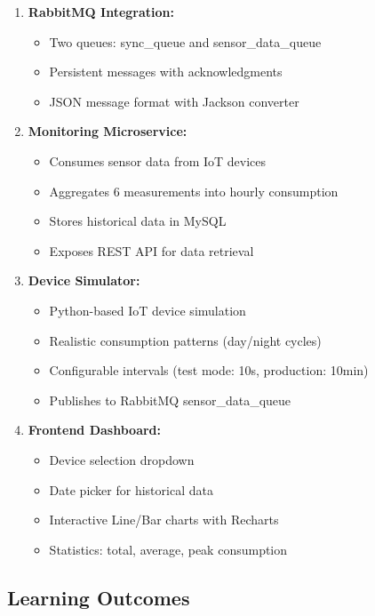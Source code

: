 \documentclass[12pt,a4paper]{article}
\begin{document}
\begin{enumerate}
    \item \textbf{RabbitMQ Integration:}
    \begin{itemize}
        \item Two queues: sync\_queue and sensor\_data\_queue
        \item Persistent messages with acknowledgments
        \item JSON message format with Jackson converter
    \end{itemize}
    
    \item \textbf{Monitoring Microservice:}
    \begin{itemize}
        \item Consumes sensor data from IoT devices
        \item Aggregates 6 measurements into hourly consumption
        \item Stores historical data in MySQL
        \item Exposes REST API for data retrieval
    \end{itemize}
    
    \item \textbf{Device Simulator:}
    \begin{itemize}
        \item Python-based IoT device simulation
        \item Realistic consumption patterns (day/night cycles)
        \item Configurable intervals (test mode: 10s, production: 10min)
        \item Publishes to RabbitMQ sensor\_data\_queue
    \end{itemize}
    
    \item \textbf{Frontend Dashboard:}
    \begin{itemize}
        \item Device selection dropdown
        \item Date picker for historical data
        \item Interactive Line/Bar charts with Recharts
        \item Statistics: total, average, peak consumption
    \end{itemize}
\end{enumerate}

\subsection{Learning Outcomes}
\end{document}
